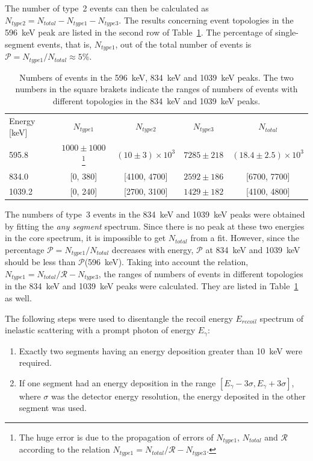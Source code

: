 The number of type~2 events can then be calculated as $N_{type2} = N_{total} - N_{type1} - N_{type3}$. The results concerning event topologies in the 596~keV peak are listed in the second row of Table~\ref{tab:neu:ncore}. The percentage of single-segment events, that is, $N_{type1}$, out of the total number of events is $\mathcal{P} = N_{type1} / N_{total} \approx 5\%$.
\begin{table}[tbhp]
  \caption{Numbers of events in the 596~keV, 834~keV and 1039~keV
    peaks.    The two numbers in the square brakets indicate the     ranges of    numbers     of events with different topologies in     the     834~keV and 1039~keV    peaks.}
  \label{tab:neu:ncore}\centering
  \begin{minipage}{\textwidth}\centering
    \begin{tabular}{lcccc} \hline\noalign{\smallskip}
      Energy [keV]& $N_{type 1}$ & $N_{type 2}$  & $N_{type 3}$    &
$N_{total}$   \\
      \noalign{\smallskip}\hline\noalign{\smallskip} 595.8 &
      $1000 \pm 1000$ \footnote{The huge error is due to the
        propagation of errors of $N_{type1}$, $N_{total}$ and
        $\mathcal{R}$ according to the relation $N_{type1} = N_{total}
        / \mathcal{R} - N_{type3}$.}
      & $(10 \pm 3)\times10^3$ & $7285 \pm 218$ & $(18.4 \pm
2.5)\times10^3$ \\
      834.0  & [0, 380]    & [4100, 4700] & $2592 \pm 186$ & [6700,
7700] \\
      1039.2 & [0, 240]    & [2700, 3100] & $1429 \pm 182$ & [4100,
4800] \\
    \end{tabular}
  \end{minipage}
\end{table}

The numbers of type~3 events in the 834~keV and 1039~keV peaks were
obtained by fitting the \emph{any segment} spectrum. Since there is no
peak at these two energies in the core spectrum, it is impossible to
get $N_{total}$ from a fit. However, since the percentage $\mathcal{P}
= N_{type1} / N_{total}$ decreases with energy, $\mathcal{P}$ at
834~keV and 1039~keV should be less than $\mathcal{P}$(596~keV).
Taking into account the relation, $N_{type1} = N_{total}/\mathcal{R} -
N_{type3}$, the ranges of numbers of events in different topologies in
the 834~keV and 1039~keV peaks were calculated. They are listed in
Table~\ref{tab:neu:ncore} as well.

The following steps were used to disentangle the recoil energy
$E_{recoil}$ spectrum of inelastic scattering with a prompt photon of
energy $E_\gamma$:
\begin{enumerate}
\item Exactly two segments having an energy deposition greater than
  10~keV were required.
\item If one segment had an energy deposition in the range
  $[E_\gamma-3\sigma, E_\gamma+3\sigma]$, where $\sigma$ was the
  detector energy resolution, the energy deposited in the other
  segment was used.
\end{enumerate}

